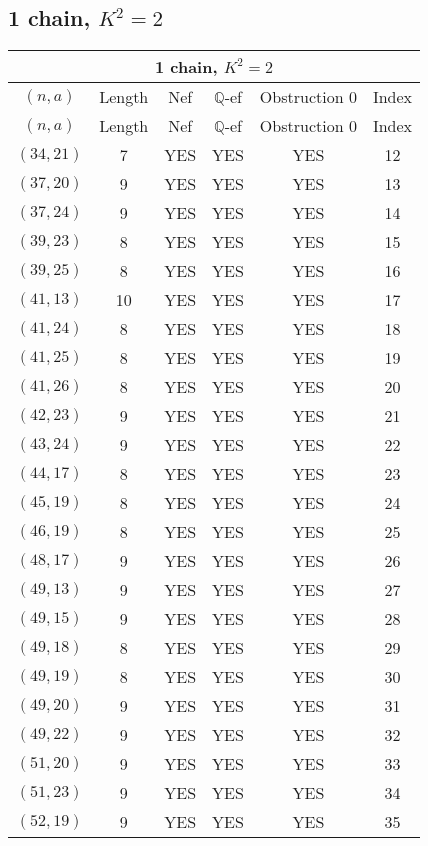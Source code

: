 \subsection{1 chain, $K^2 = 2$}
\begin{longtable}{|c|c|c|c|c|c|}
\hline
\multicolumn{6}{|c|}{1 chain, $K^2 = 2$}\\
\hline
$(n,a)$ & Length & Nef & $\mathbb Q$-ef & Obstruction 0 & Index\\
\hline
\endfirsthead

\hline
$(n,a)$ & Length & Nef & $\mathbb Q$-ef & Obstruction 0 & Index\\
\hline
\endhead
\hline
\endfoot

$(34, 21)$ & 7 & YES & YES & YES & 12\\
$(37, 20)$ & 9 & YES & YES & YES & 13\\
$(37, 24)$ & 9 & YES & YES & YES & 14\\
$(39, 23)$ & 8 & YES & YES & YES & 15\\
$(39, 25)$ & 8 & YES & YES & YES & 16\\
$(41, 13)$ & 10 & YES & YES & YES & 17\\
$(41, 24)$ & 8 & YES & YES & YES & 18\\
$(41, 25)$ & 8 & YES & YES & YES & 19\\
$(41, 26)$ & 8 & YES & YES & YES & 20\\
$(42, 23)$ & 9 & YES & YES & YES & 21\\
$(43, 24)$ & 9 & YES & YES & YES & 22\\
$(44, 17)$ & 8 & YES & YES & YES & 23\\
$(45, 19)$ & 8 & YES & YES & YES & 24\\
$(46, 19)$ & 8 & YES & YES & YES & 25\\
$(48, 17)$ & 9 & YES & YES & YES & 26\\
$(49, 13)$ & 9 & YES & YES & YES & 27\\
$(49, 15)$ & 9 & YES & YES & YES & 28\\
$(49, 18)$ & 8 & YES & YES & YES & 29\\
$(49, 19)$ & 8 & YES & YES & YES & 30\\
$(49, 20)$ & 9 & YES & YES & YES & 31\\
$(49, 22)$ & 9 & YES & YES & YES & 32\\
$(51, 20)$ & 9 & YES & YES & YES & 33\\
$(51, 23)$ & 9 & YES & YES & YES & 34\\
$(52, 19)$ & 9 & YES & YES & YES & 35\\

\end{longtable}
